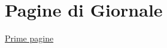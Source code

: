 \section{Pagine di Giornale}\label{pagine-di-giornale}

\href{Prime\%20pagine\%20849d812b7e344b5ea93c35d23f0d4472.csv}{Prime
pagine}
